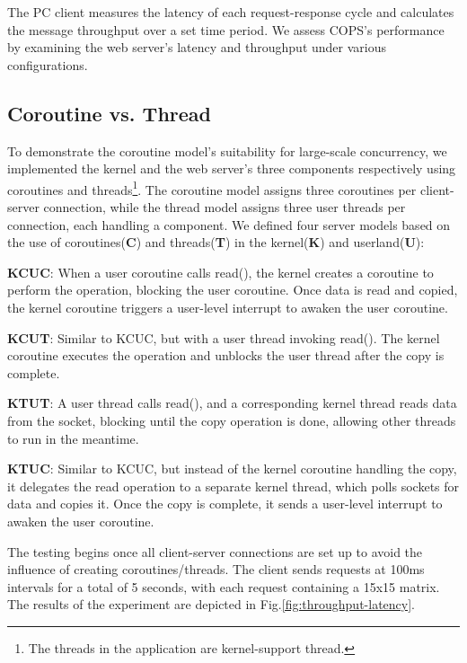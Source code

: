 \documentclass[conference]{IEEEtran}
\begin{document}
The PC client measures the latency of each request-response cycle and calculates the message throughput over a set time period. We assess COPS's performance by examining the web server's latency and throughput under various configurations.

\subsection{Coroutine vs. Thread}

To demonstrate the coroutine model's suitability for large-scale concurrency, we implemented the kernel and the web server's three components respectively using coroutines and threads\footnote{The threads in the application are kernel-support thread.}. The coroutine model assigns three coroutines per client-server connection, while the thread model assigns three user threads per connection, each handling a component. We defined four server models based on the use of coroutines(\textbf{C}) and threads(\textbf{T}) in the kernel(\textbf{K}) and userland(\textbf{U}):

\textbf{KCUC}: When a user coroutine calls read(), the kernel creates a coroutine to perform the operation, blocking the user coroutine. Once data is read and copied, the kernel coroutine triggers a user-level interrupt to awaken the user coroutine.

\textbf{KCUT}: Similar to KCUC, but with a user thread invoking read(). The kernel coroutine executes the operation and unblocks the user thread after the copy is complete.

\textbf{KTUT}: A user thread calls read(), and a corresponding kernel thread reads data from the socket, blocking until the copy operation is done, allowing other threads to run in the meantime.
	
\textbf{KTUC}: Similar to KCUC, but instead of the kernel coroutine handling the copy, it delegates the read operation to a separate kernel thread, which polls sockets for data and copies it. Once the copy is complete, it sends a user-level interrupt to awaken the user coroutine.

The testing begins once all client-server connections are set up to avoid the influence of creating coroutines/threads. The client sends requests at 100ms intervals for a total of 5 seconds, with each request containing a 15x15 matrix. The results of the experiment are depicted in Fig.\ref{fig:throughput-latency}.
\end{document}
